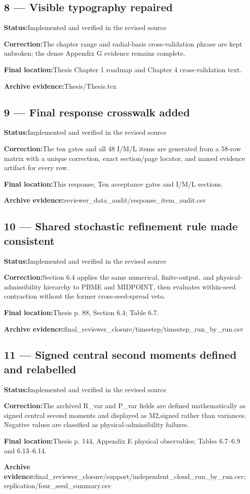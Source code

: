\documentclass[11pt]{article}
\newcommand{\field}[2]{\textbf{#1}\quad #2\par}
\begin{document}
\subsection*{8 --- Visible typography repaired}
\field{Status:}{Implemented and verified in the revised source}
\field{Correction:}{The chapter range and radial-basis cross-validation phrase are kept unbroken; the dense Appendix G evidence remains complete.}
\field{Final location:}{Thesis Chapter 1 roadmap and Chapter 4 cross-validation text.}
\field{Archive evidence:}{Thesis/Thesis.tex}
\subsection*{9 --- Final response crosswalk added}
\field{Status:}{Implemented and verified in the revised source}
\field{Correction:}{The ten gates and all 48 I/M/L items are generated from a 58-row matrix with a unique correction, exact section/page locator, and named evidence artifact for every row.}
\field{Final location:}{This response, Ten acceptance gates and I/M/L sections.}
\field{Archive evidence:}{reviewer\_data\_audit/response\_item\_audit.csv}
\subsection*{10 --- Shared stochastic refinement rule made consistent}
\field{Status:}{Implemented and verified in the revised source}
\field{Correction:}{Section 6.4 applies the same numerical, finite-output, and physical-admissibility hierarchy to PBME and MIDPOINT, then evaluates within-seed contraction without the former cross-seed-spread veto.}
\field{Final location:}{Thesis p. 88, Section 6.4; Table 6.7.}
\field{Archive evidence:}{final\_reviewer\_closure/timestep/timestep\_run\_by\_run.csv}
\subsection*{11 --- Signed central second moments defined and relabelled}
\field{Status:}{Implemented and verified in the revised source}
\field{Correction:}{The archived R\_var and P\_var fields are defined mathematically as signed central second moments and displayed as M2,signed rather than variances. Negative values are classified as physical-admissibility failures.}
\field{Final location:}{Thesis p. 144, Appendix E physical observables; Tables 6.7--6.9 and 6.13--6.14.}
\field{Archive evidence:}{final\_reviewer\_closure/support/independent\_cloud\_run\_by\_run.csv; replication/four\_seed\_summary.csv}
\end{document}
